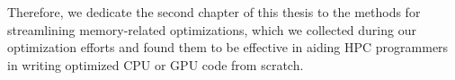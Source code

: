 Therefore, we dedicate the second chapter of this thesis to the methods for streamlining memory-related optimizations, which we collected during our optimization efforts and found them to be effective in aiding HPC programmers in writing optimized CPU or GPU code from scratch.















